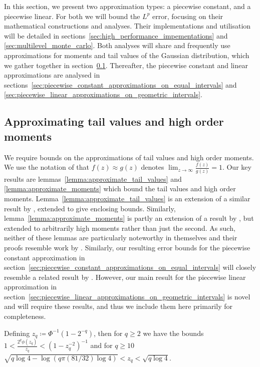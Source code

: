 \documentclass[manuscript,review]{acmart}
\begin{document}
In this section, we present two approximation types: a piecewise constant, and a piecewise linear. For both we will bound the $ L^p $ error, focusing on their mathematical constructions and analyses. Their implementations and utilisation will be detailed in sections~\ref{sec:high_performance_impementations} and \ref{sec:multilevel_monte_carlo}. Both analyses will share and frequently use approximations for moments and tail values of the Gaussian distribution, which we gather together in section~\ref{sec:approximating_tail_values_and_high_order_moments}. Thereafter, the piecewise constant and linear approximations are analysed in sections~\ref{sec:piecewise_constant_approximations_on_equal_intervals} and \ref{sec:piecewise_linear_approximations_on_geometric_intervals}.

\subsection{Approximating tail values and high order moments}
\label{sec:approximating_tail_values_and_high_order_moments}

We require bounds on the approximations of tail values and high order moments. We use the notation of \citet{giles2019random_quadrature} that $ f(z) \approx g(z) $ denotes $ \lim_{z\to\infty} \tfrac{f(z)}{g(z)} = 1 $. Our key results are lemmas~\ref{lemma:approximate_tail_values} and \ref{lemma:approximate_moments} which bound the tail values and high order moments. Lemma~\ref{lemma:approximate_tail_values} is an extension of a similar result by \citet[lemma~7]{giles2019random_quadrature}, extended to give enclosing bounds. Similarly, lemma~\ref{lemma:approximate_moments} is partly an extension of a result by \citet[lemma~9]{giles2019random_quadrature}, but extended to arbitrarily high moments rather than just the second. As such, neither of these lemmas are particularly noteworthy in themselves and their proofs resemble work by \citet[appendix~A]{giles2019random_quadrature}. Similarly, our resulting error bounds for the piecewise constant approximation in section~\ref{sec:piecewise_constant_approximations_on_equal_intervals} will closely resemble a related result by \citet[theorem~1]{giles2019random_quadrature}. However, our main result for the piecewise linear approximation in section~\ref{sec:piecewise_linear_approximations_on_geometric_intervals} is novel and will require these results, and thus we include them here primarily for completeness. 

\begin{lemma}
\label{lemma:approximate_tail_values}
Defining $ z_q \coloneqq \Phi^{-1}(1 {-} 2^{-q})$, then for $ q \geq  2 $ we have the bounds $ 1 < \tfrac{2^q\phi(z_q)}{z_q} < (1 - z_q^{-2})^{-1}$  and for  $ q \geq 10 $
$ \sqrt{q \log 4 - \log(q \pi (81/32) \log 4)} < z_q  < \sqrt{q \log 4}$.
\end{lemma}
\end{document}
